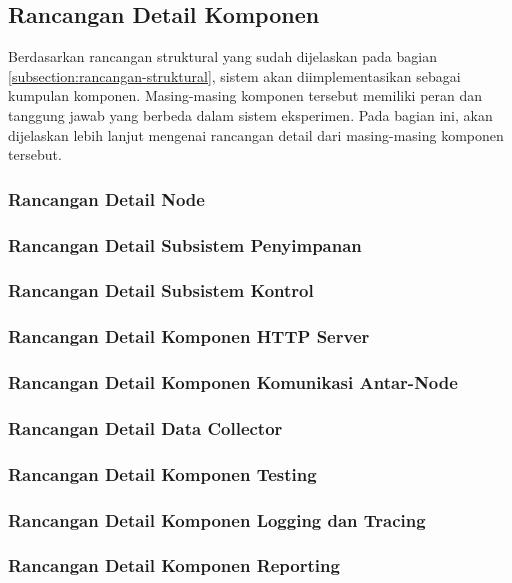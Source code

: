 \newpage
\subsection{Rancangan Detail Komponen}
\label{subsection:detail-komponen}

Berdasarkan rancangan struktural yang sudah dijelaskan pada bagian \ref{subsection:rancangan-struktural}, sistem akan diimplementasikan sebagai kumpulan komponen. Masing-masing komponen tersebut memiliki peran dan tanggung jawab yang berbeda dalam sistem eksperimen. Pada bagian ini, akan dijelaskan lebih lanjut mengenai rancangan detail dari masing-masing komponen tersebut.

\subsubsection{Rancangan Detail Node}
\label{subsubsection:detail-node}

\subsubsection{Rancangan Detail Subsistem Penyimpanan}
\label{subsubsection:detail-subsistem-penyimpanan}

\subsubsection{Rancangan Detail Subsistem Kontrol}
\label{subsubsection:detail-subsistem-kontrol}

\subsubsection{Rancangan Detail Komponen HTTP Server}
\label{subsubsection:detail-komponen-HTTP-server}

\subsubsection{Rancangan Detail Komponen Komunikasi Antar-Node}
\label{subsubsection:detail-subsistem-komunikasi-antar-node}

\subsubsection{Rancangan Detail Data Collector}
\label{subsubsection:detail-data-collector}

\subsubsection{Rancangan Detail Komponen Testing}
\label{subsubsection:detail-data-collector}

\subsubsection{Rancangan Detail Komponen Logging dan Tracing}
\label{subsubsection:detail-data-collector}

\subsubsection{Rancangan Detail Komponen Reporting}
\label{subsubsection:detail-data-collector}
